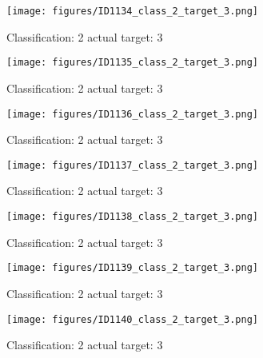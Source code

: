 \begin{figure}[h!]
\begin{center}
\texttt{[image: figures/ID1134\_class\_2\_target\_3.png]}
\end{center}
\caption{ Classification: 2 actual target: 3}
\label{fig:ID1134_class_2_target_3}
\end{figure}
\begin{figure}[h!]
\begin{center}
\texttt{[image: figures/ID1135\_class\_2\_target\_3.png]}
\end{center}
\caption{ Classification: 2 actual target: 3}
\label{fig:ID1135_class_2_target_3}
\end{figure}
\begin{figure}[h!]
\begin{center}
\texttt{[image: figures/ID1136\_class\_2\_target\_3.png]}
\end{center}
\caption{ Classification: 2 actual target: 3}
\label{fig:ID1136_class_2_target_3}
\end{figure}
\begin{figure}[h!]
\begin{center}
\texttt{[image: figures/ID1137\_class\_2\_target\_3.png]}
\end{center}
\caption{ Classification: 2 actual target: 3}
\label{fig:ID1137_class_2_target_3}
\end{figure}
\begin{figure}[h!]
\begin{center}
\texttt{[image: figures/ID1138\_class\_2\_target\_3.png]}
\end{center}
\caption{ Classification: 2 actual target: 3}
\label{fig:ID1138_class_2_target_3}
\end{figure}
\begin{figure}[h!]
\begin{center}
\texttt{[image: figures/ID1139\_class\_2\_target\_3.png]}
\end{center}
\caption{ Classification: 2 actual target: 3}
\label{fig:ID1139_class_2_target_3}
\end{figure}
\begin{figure}[h!]
\begin{center}
\texttt{[image: figures/ID1140\_class\_2\_target\_3.png]}
\end{center}
\caption{ Classification: 2 actual target: 3}
\label{fig:ID1140_class_2_target_3}
\end{figure}

